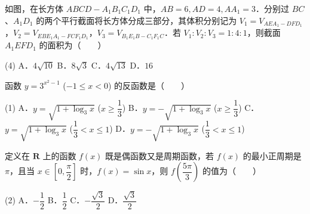 \begin{question}
如图，在长方体 $ABCD - A_1B_1C_1D_1$ 中，$AB = 6, AD = 4, AA_1 = 3$．分别过 $BC$、$A_1D_1$ 的两个平行截面将长方体分成三部分，其体积分别记为 $V_1 = V_{AEA_1-DFD_1}$，$V_2 = V_{EBE_1A_1-FCF_1D_1}$，$V_3 = V_{B_1E_1B-C_1F_1C}$．若 $V_1 : V_2 : V_3 = 1 : 4 : 1$，则截面 $A_1EFD_1$ 的面积为\mbox{（　　）}
\nopagebreak[4]
\begin{center}\end{center}
\nopagebreak[4]
\begin{gkopts}(4)
\task A．$4\sqrt{10}$
\task B．$8\sqrt{3}$
\task C．$4\sqrt{13}$
\task D．$16$
\end{gkopts}

\end{question}
\begin{question}
函数 $y = 3^{x^2 - 1}$ ($-1 \le x < 0$) 的反函数是\mbox{（　　）}

\begin{gkopts}(1)
\task A．$y = \sqrt{1 + \log_3 x}$ ($x \ge \dfrac{1}{3}$)
\task B．$y = -\sqrt{1 + \log_3 x}$ ($x \ge \dfrac{1}{3}$)
\task C．$y = \sqrt{1 + \log_3 x}$ ($\dfrac{1}{3} < x \le 1$)
\task D．$y = -\sqrt{1 + \log_3 x}$ ($\dfrac{1}{3} < x \le 1$)
\end{gkopts}

\end{question}
\begin{question}
定义在 $\mathbf{R}$ 上的函数 $f(x)$ 既是偶函数又是周期函数，若 $f(x)$ 的最小正周期是 $\pi$，且当 $x \in \left[0, \dfrac{\pi}{2}\right]$ 时，$f(x) = \sin x$，则 $f\left(\dfrac{5\pi}{3}\right)$ 的值为\mbox{（　　）}

\begin{gkopts}(2)
\task A．$-\dfrac{1}{2}$
\task B．$\dfrac{1}{2}$
\task C．$-\dfrac{\sqrt{3}}{2}$
\task D．$\dfrac{\sqrt{3}}{2}$
\end{gkopts}

\end{question}

